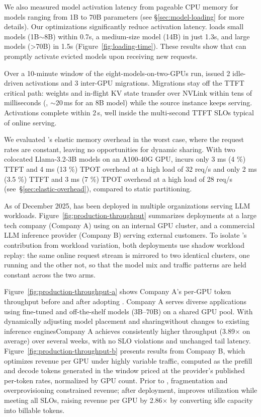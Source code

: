 
We also measured model activation latency from pageable CPU memory for models ranging from 1B to 70B parameters (see \S\ref{sec:model-loading} for more details).
Our optimizations significantly reduce activation latency. \tool loads small models (1B$\sim$8B) within 0.7s, a medium-size model (14B) in just 1.3s, and large models (>70B) in 1.5s (Figure~\ref{fig:loading-time}).
These results show that \tool can promptly activate evicted models upon receiving new requests.

Over a 10-minute window of the eight-models-on-two-GPUs run, \tool issued 2 idle-driven activations and 3 inter-GPU migrations. Migrations stay off the TTFT critical path: weights and in-flight KV state transfer over NVLink within tens of milliseconds (\eg, $\sim$20\,ms for an 8B model) while the source instance keeps serving. Activations complete within 2\,s, well inside the multi-second TTFT SLOs typical of online serving.

We evaluated \tool's elastic memory overhead in the worst case, where the request rates are constant, leaving no opportunities for dynamic sharing. With two colocated Llama-3.2-3B models on an A100-40G GPU, \tool incurs
 only 3 ms (4 \%) TTFT and 4 ms (13 \%) TPOT overhead at a high load of 32 req/s and
only 2 ms (3.5 \%) TTFT and 3 ms (7 \%) TPOT overhead at a high load of 28 req/s (see~\S\ref{sec:elastic-overhead}), compared to static partitioning.

As of December 2025, \tool has been deployed in multiple organizations serving LLM workloads. Figure~\ref{fig:production-throughput} summarizes deployments at a large tech company (Company A) using \tool on an internal GPU cluster, and a commercial LLM inference provider (Company B) serving external customers.
To isolate \tool's contribution from workload variation, both deployments use shadow workload replay: the same online request stream is mirrored to two identical clusters, one running \tool and the other not, so that the model mix and traffic patterns are held constant across the two arms.

Figure~\ref{fig:production-throughput-a} shows Company A’s per-GPU token throughput before and after adopting \tool. Company A serves diverse applications using fine-tuned and off-the-shelf models (3B–70B) on a shared GPU pool. With \tool dynamically adjusting model placement and sharing\textemdash without changes to existing inference engines\textemdash Company A achieves consistently higher throughput (3.89× on average) over several weeks, with no SLO violations and unchanged tail latency. Figure~\ref{fig:production-throughput-b} presents results from Company B, which optimizes revenue per GPU under highly variable traffic, computed as the prefill and decode tokens generated in the window priced at the provider's published per-token rates, normalized by GPU count. Prior to \tool, fragmentation and overprovisioning constrained revenue; after deployment, \tool improves utilization while meeting all SLOs, raising revenue per GPU by 2.86$\times$ by converting idle capacity into billable tokens.

